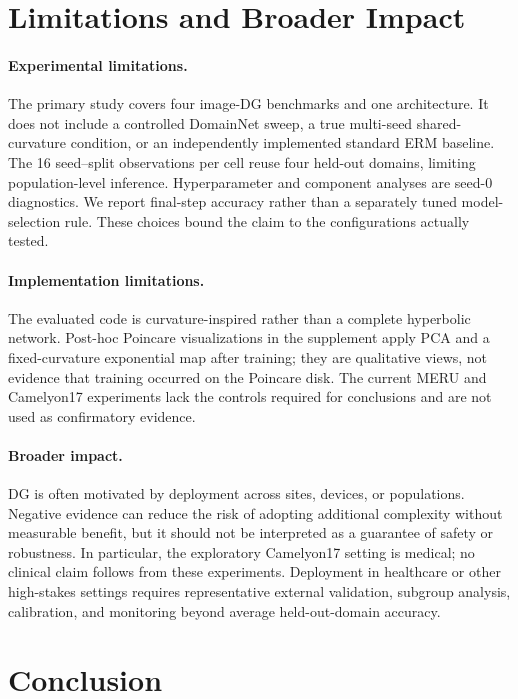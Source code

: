 \documentclass[10pt]{article}
\begin{document}
\section{Limitations and Broader Impact}
\label{sec:limitations}

\paragraph{Experimental limitations.}
The primary study covers four image-DG benchmarks and one architecture. It does
not include a controlled DomainNet sweep, a true multi-seed shared-curvature
condition, or an independently implemented standard ERM baseline. The 16
seed--split observations per cell reuse four held-out domains, limiting
population-level inference. Hyperparameter and component analyses are seed-0
diagnostics. We report final-step accuracy rather than a separately tuned
model-selection rule. These choices bound the claim to the configurations
actually tested.

\paragraph{Implementation limitations.}
The evaluated code is curvature-inspired rather than a complete hyperbolic
network. Post-hoc Poincare visualizations in the supplement apply PCA and a
fixed-curvature exponential map after training; they are qualitative views,
not evidence that training occurred on the Poincare disk. The current MERU and
Camelyon17 experiments lack the controls required for conclusions and are not
used as confirmatory evidence.

\paragraph{Broader impact.}
DG is often motivated by deployment across sites, devices, or populations.
Negative evidence can reduce the risk of adopting additional complexity without
measurable benefit, but it should not be interpreted as a guarantee of safety
or robustness. In particular, the exploratory Camelyon17 setting is medical;
no clinical claim follows from these experiments. Deployment in healthcare or
other high-stakes settings requires representative external validation,
subgroup analysis, calibration, and monitoring beyond average held-out-domain
accuracy.

\section{Conclusion}
\label{sec:conclusion}
\end{document}

